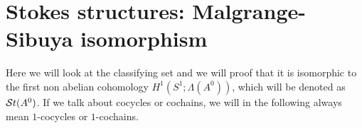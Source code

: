 \section{Stokes structures: Malgrange-Sibuya isomorphism}\label{sec:mainThm1}
Here we will look at the classifying set and we will proof that it is
isomorphic \TODO[as\dots] to the first non abelian cohomology 
$H^1(S^1;\Lambda(A^0))$, which will be denoted as $\mathcal{S}{}t(A^0)$.
If we talk about cocycles or cochains, we will in the following always mean
$1$-cocycles or $1$-cochains.

